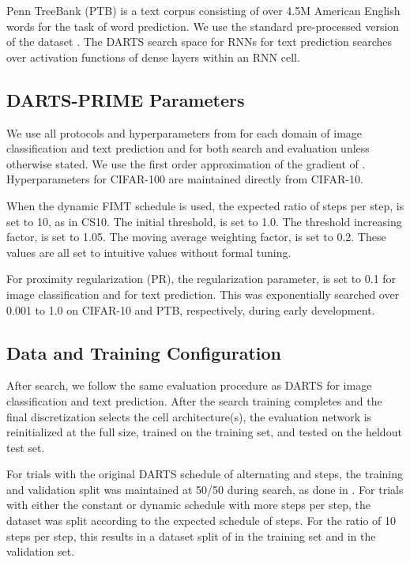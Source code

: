 \documentclass[letterpaper]{article} \usepackage{aaai22}  \usepackage{times}  \usepackage{helvet}  \usepackage{courier}  \usepackage[hyphens]{url}  \usepackage{graphicx} \urlstyle{rm} \def\UrlFont{\rm}  \usepackage{natbib}  \usepackage{caption} \DeclareCaptionStyle{ruled}{labelfont=normalfont,labelsep=colon,strut=off} \frenchspacing  \setlength{\pdfpagewidth}{8.5in}  \setlength{\pdfpageheight}{11in}  \usepackage{algorithm}
\begin{document}
Penn TreeBank \cite{marcus1993building} (PTB) is a text corpus consisting of over 4.5M American English words for the task of word prediction. We
use the standard pre-processed version of the dataset \cite{pham2018efficient, liu2018darts}. The DARTS search space for RNNs for text prediction searches over activation functions of dense layers within an RNN cell. 

\subsection{DARTS-PRIME Parameters}

We use all protocols and hyperparameters from \cite{liu2018darts} for each domain of image classification and text prediction and for both search and evaluation unless otherwise stated.  We use the first order approximation of the gradient of . Hyperparameters for CIFAR-100 are maintained directly from CIFAR-10. 

When the dynamic FIMT schedule is used, the expected ratio of  steps per  step,  is set to 10, as in CS10. The initial threshold,  is set to 1.0. The threshold increasing factor,  is set to 1.05. The moving average weighting factor,  is set to 0.2. These values are all set to intuitive values without formal tuning.

For proximity regularization (PR), the regularization parameter,  is set to 0.1 for image classification and  for text prediction. This was exponentially searched over 0.001 to 1.0 on CIFAR-10 and PTB, respectively, during early development.

\subsection{Data and Training Configuration}

After search, we follow the same evaluation procedure as DARTS for image classification and text prediction. After the search training completes and the final discretization selects the cell architecture(s), the evaluation network is reinitialized at the full size, trained on the training set, and tested on the heldout test set.

For trials with the original DARTS schedule of alternating  and  steps, the training and validation split was maintained at 50/50 during search, as done in \cite{liu2018darts}. For trials with either the constant or dynamic schedule with more  steps per  step, the dataset was split according to the expected schedule of steps. For the ratio of 10  steps per  step, this results in a dataset split of  in the training set and  in the validation set.
\end{document}
